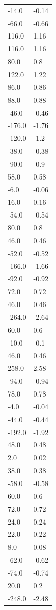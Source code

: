 \begin{longtable}{ll}
-14.0 & -0.14 \\
-66.0 & -0.66 \\
116.0 & 1.16 \\
116.0 & 1.16 \\
80.0 & 0.8 \\
122.0 & 1.22 \\
86.0 & 0.86 \\
88.0 & 0.88 \\
-46.0 & -0.46 \\
-176.0 & -1.76 \\
-120.0 & -1.2 \\
-38.0 & -0.38 \\
-90.0 & -0.9 \\
58.0 & 0.58 \\
-6.0 & -0.06 \\
16.0 & 0.16 \\
-54.0 & -0.54 \\
80.0 & 0.8 \\
46.0 & 0.46 \\
-52.0 & -0.52 \\
-166.0 & -1.66 \\
-92.0 & -0.92 \\
72.0 & 0.72 \\
46.0 & 0.46 \\
-264.0 & -2.64 \\
60.0 & 0.6 \\
-10.0 & -0.1 \\
46.0 & 0.46 \\
258.0 & 2.58 \\
-94.0 & -0.94 \\
78.0 & 0.78 \\
-4.0 & -0.04 \\
-44.0 & -0.44 \\
-192.0 & -1.92 \\
48.0 & 0.48 \\
2.0 & 0.02 \\
38.0 & 0.38 \\
-58.0 & -0.58 \\
60.0 & 0.6 \\
72.0 & 0.72 \\
24.0 & 0.24 \\
22.0 & 0.22 \\
8.0 & 0.08 \\
-62.0 & -0.62 \\
-74.0 & -0.74 \\
20.0 & 0.2 \\
-248.0 & -2.48 \\

\end{longtable}
